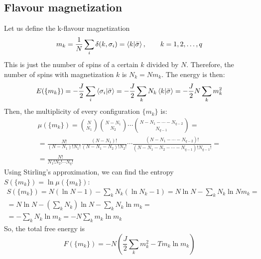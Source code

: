 \documentclass{article}
\begin{document}
\subsection{Flavour magnetization}
Let us define the k-flavour magnetization
\begin{equation}
    m_k = \frac{1}{N} \sum_i \delta(k, \sigma_i) = \bra{k} \ket{\bar{\sigma}}, \qquad k = 1,2,\dots,q
\end{equation}
This is just the number of spins of a certain $k$ divided by $N$. Therefore, the number of spins with magnetization $k$ is $N_k = Nm_k$. The energy is then:
\begin{equation}
    E(\{m_k\}) = -\frac{J}{2}\sum_i \braket{\sigma_i}{\bar{\sigma}}
     = -\frac{J}{2}\sum_k N_k \braket{k}{\bar{\sigma}}
     = -\frac{J}{2}N\sum_k m_k^2
\end{equation}
Then, the multiplicity of every configuration $\{m_k\}$ is:
\begin{equation}
\begin{gathered}
    \mu(\{m_k\}) =
    \binom{N}{N_1}
    \binom{N - N_1}{N_2}
    \cdots
    \binom{N - N_1 - \cdots - N_{q-2}}{N_{q-1}}
    = \\ =
    \frac{N!}{(N-N_1)!N_1!}
    \frac{(N-N_1)!}{(N-N_1-N_2)!N_2!}
    \cdots
    \frac{(N - N_1 - \cdots - N_{q-2})!}{(N-N_1-N_2-\cdots-N_{q-1})!N_{q-1}!}
    = \\ =
    \frac{N!}{N_1!N_2!\cdots N_q!}
\end{gathered}
\end{equation}
Using Stirling's approximation, we can find the entropy $S(\{m_k\}) = \ln \mu(\{m_k\})$:
\begin{equation}
\begin{gathered}
    S(\{m_k\}) = N(\ln N - 1) - \sum_k N_k(\ln N_k - 1) =
    N \ln N - \sum_k N_k \ln Nm_k = \\ =
    N \ln N - \left(\sum_k N_k\right) \ln N - \sum_k N_k \ln m_k = \\ =
    - \sum_k N_k \ln m_k = - N\sum_k m_k \ln m_k
\end{gathered}
\end{equation}
So, the total free energy is
\begin{equation}
    F(\{m_k\}) = -N \left(\frac{J}{2} \sum_k m_k^2 - T m_k \ln m_k\right)
\end{equation}
\end{document}
